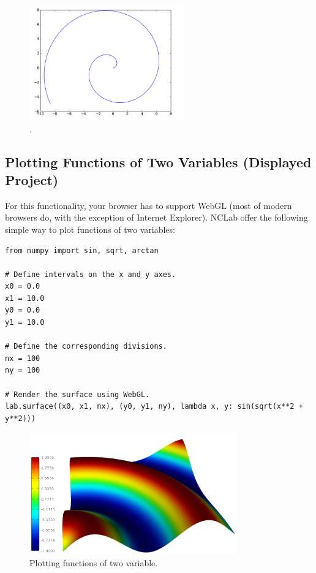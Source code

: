 \documentclass[article,A4,12pt]{llncs}
\begin{document}
\begin{figure}[!ht]
\begin{center}
\includegraphics[width=0.6\textwidth]{img/plot6.png}
\end{center}
\vspace{-6mm}
\caption{.}
\label{fig:plot6}
\vspace{-4mm}
\end{figure}
\noindent


\subsection{Plotting Functions of Two Variables (Displayed Project)}

For this functionality, your browser has to support WebGL (most of modern browsers do, 
with the exception of Internet Explorer). NCLab offer the following simple way to plot 
functions of two variables:

{\small
\begin{verbatim}
from numpy import sin, sqrt, arctan

# Define intervals on the x and y axes.
x0 = 0.0
x1 = 10.0
y0 = 0.0
y1 = 10.0

# Define the corresponding divisions.
nx = 100
ny = 100

# Render the surface using WebGL.
lab.surface((x0, x1, nx), (y0, y1, ny), lambda x, y: sin(sqrt(x**2 + y**2)))
\end{verbatim}
}

\begin{figure}[!ht]
\begin{center}
\includegraphics[width=0.8\textwidth]{img/webgl.png}
\end{center}
\vspace{-2mm}
\caption{Plotting functions of two variable.}
\label{fig:webgl}
\end{figure}
\end{document}

